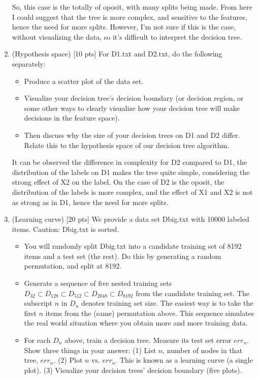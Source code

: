 \documentclass[a4paper]{article}
\theoremstyle{definition}
\begin{document}
\begin{enumerate}
  So, this case is the totally of oposit, with many splits being made. From here I could suggest that the tree is more complex, and sensitive to the features, hence the need for more splits. However, I'm not sure if this is the case, without visualizing the data, so it's difficult to interpret the decision tree.

  \item (Hypothesis space)  [10 pts] For D1.txt and D2.txt, do the following separately:
  \begin{itemize}
  
  \item Produce a scatter plot of the data set.

  \item Visualize your decision tree's decision boundary (or decision region, or some other ways to clearly visualize how your decision tree will make decisions in the feature space).

  \item Then discuss why the size of your decision trees on D1 and D2 differ.  Relate this to the hypothesis space of our decision tree algorithm. \\

  \end{itemize}

It can be observed the difference in complexity for D2 compared to D1, the distribution of the labels on D1 makes the tree quite simple, considering the strong effect of X2 on the label. On the case of D2 is the oposit, the distribution of the labels is more complex, and the effect of X1 and X2 is not as strong as in D1, hence the need for more splits.  

\item (Learning curve)  [20 pts] We provide a data set Dbig.txt with 10000 labeled items.  Caution: Dbig.txt is sorted.
  \begin{itemize}
  
  \item You will randomly split Dbig.txt into a candidate training set of 8192 items and a test set (the rest).  Do this by generating a random permutation, and split at 8192.
  
  \item Generate a sequence of five nested training sets $D_{32} \subset D_{128} \subset D_{512} \subset D_{2048} \subset D_{8192}$ from the candidate training set.  The subscript $n$ in $D_n$ denotes training set size.  The easiest way is to take the first $n$ items from the (same) permutation above.  This sequence simulates the real world situation where you obtain more and more training data.
  
  \item For each $D_n$ above, train a decision tree.  Measure its test set error $err_n$.  Show three things in your answer: (1) List $n$, number of nodes in that tree, $err_n$. (2) Plot $n$ vs. $err_n$.  This is known as a learning curve (a single plot). (3) Visualize your decision trees' decision boundary (five plots). \\
  \end{itemize}
  
\end{enumerate}
\end{document}
